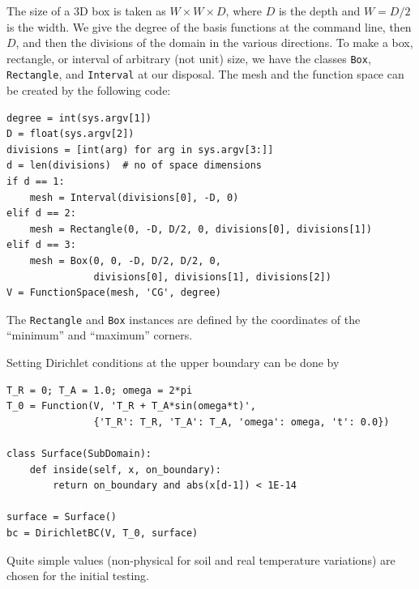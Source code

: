 The size of a 3D box is taken as $W\times W\times D$, where $D$ is
the depth and $W=D/2$ is the width.
We give the degree of the basis functions at the command line, then $D$,
and then the divisions of the domain in the various directions.
To make a box, rectangle, or interval of arbitrary (not unit) size,
we have the \dolfin{} classes {\fontsize{12pt}{12pt}\texttt{Box}}, {\fontsize{12pt}{12pt}\texttt{Rectangle}}, and
{\fontsize{12pt}{12pt}\texttt{Interval}} at our disposal. The mesh and the function space
can be created by the following code:
\begin{Verbatim}[fontsize=\fontsize{10pt}{10pt},tabsize=8,baselinestretch=1.05,
fontfamily=tt,xleftmargin=7mm]
degree = int(sys.argv[1])
D = float(sys.argv[2])
divisions = [int(arg) for arg in sys.argv[3:]]
d = len(divisions)  # no of space dimensions
if d == 1:
    mesh = Interval(divisions[0], -D, 0)
elif d == 2:
    mesh = Rectangle(0, -D, D/2, 0, divisions[0], divisions[1])
elif d == 3:
    mesh = Box(0, 0, -D, D/2, D/2, 0,
               divisions[0], divisions[1], divisions[2])
V = FunctionSpace(mesh, 'CG', degree)
\end{Verbatim}
\noindent
The {\fontsize{12pt}{12pt}\texttt{Rectangle}} and {\fontsize{12pt}{12pt}\texttt{Box}} instances are defined by the coordinates
of the ``minimum'' and ``maximum'' corners.

Setting Dirichlet conditions at the upper boundary can be done by
\begin{Verbatim}[fontsize=\fontsize{10pt}{10pt},tabsize=8,baselinestretch=1.05,
fontfamily=tt,xleftmargin=7mm]
T_R = 0; T_A = 1.0; omega = 2*pi
T_0 = Function(V, 'T_R + T_A*sin(omega*t)',
               {'T_R': T_R, 'T_A': T_A, 'omega': omega, 't': 0.0})

class Surface(SubDomain):
    def inside(self, x, on_boundary):
        return on_boundary and abs(x[d-1]) < 1E-14

surface = Surface()
bc = DirichletBC(V, T_0, surface)
\end{Verbatim}
\noindent
Quite simple values (non-physical for soil and real temperature variations)
are chosen for the initial testing.

